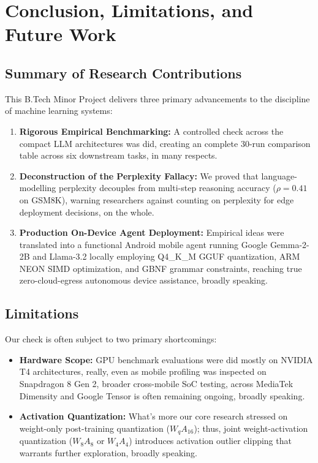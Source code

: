 \documentclass[12pt,a4paper,oneside]{report}
\begin{document}
    \chapter{Conclusion, Limitations, and Future Work}

    \section{Summary of Research Contributions}
    This B.Tech Minor Project delivers three primary advancements to the discipline of machine learning systems:
    \begin{enumerate}
        \item \textbf{Rigorous Empirical Benchmarking:} A controlled check across the compact LLM architectures was did, creating an complete 30-run comparison table across six downstream tasks, in many respects.
        \item \textbf{Deconstruction of the Perplexity Fallacy:} We proved that language-modelling perplexity decouples from multi-step reasoning accuracy ($\rho = 0.41$ on GSM8K), warning researchers against counting on perplexity for edge deployment decisions, on the whole.
        \item \textbf{Production On-Device Agent Deployment:} Empirical ideas were translated into a functional Android mobile agent running Google Gemma-2-2B and Llama-3.2 locally employing Q4\_K\_M GGUF quantization, ARM NEON SIMD optimization, and GBNF grammar constraints, reaching true zero-cloud-egress autonomous device assistance, broadly speaking.
    \end{enumerate}

    \section{Limitations}
    Our check is often subject to two primary shortcomings:
    \begin{itemize}
        \item \textbf{Hardware Scope:} GPU benchmark evaluations were did mostly on NVIDIA T4 architectures, really, even as mobile profiling was inspected on Snapdragon 8 Gen 2, broader cross-mobile SoC testing, across MediaTek Dimensity and Google Tensor is often remaining ongoing, broadly speaking.
        \item \textbf{Activation Quantization:} What's more our core research stressed on weight-only post-training quantization ($W_q A_{16}$); thus, joint weight-activation quantization ($W_8 A_8$ or $W_4 A_4$) introduces activation outlier clipping that warrants further exploration, broadly speaking.
    \end{itemize}
\end{document}
